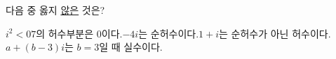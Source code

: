 다음 중 옳지 \underline{않은} 것은?
\begin{choicesv}{$i^2<0$}{$7$의 허수부분은 $0$이다.}{$-4i$는 순허수이다.}{$1+i$는 순허수가 아닌 허수이다.}{$a+(b-3)i$는 $b=3$일 때 실수이다.}\end{choicesv}
